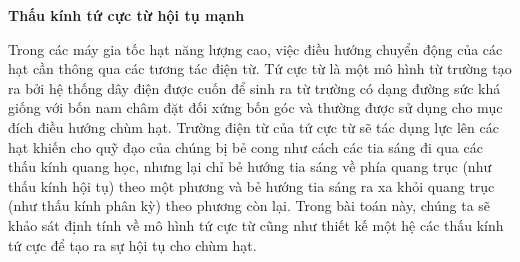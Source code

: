 \textbf{Thấu kính tứ cực từ hội tụ mạnh}

Trong các máy gia tốc hạt năng lượng cao, việc điều hướng chuyển động của các hạt cần thông qua các tương tác điện từ. Tứ cực từ là một mô hình từ trường tạo ra bởi hệ thống dây điện được cuốn để sinh ra từ trường có dạng đường sức khá giống với bốn nam châm đặt đối xứng bốn góc và thường được sử dụng cho mục đích điều hướng chùm hạt. Trường điện từ của tứ cực từ sẽ tác dụng lực lên các hạt khiến cho quỹ đạo của chúng bị bẻ cong như cách các tia sáng đi qua các thấu kính quang học, nhưng lại chỉ bẻ hướng tia sáng về phía quang trục (như thấu kính hội tụ) theo một phương và bẻ hướng tia sáng ra xa khỏi quang trục (như thấu kính phân kỳ) theo phương còn lại. Trong bài toán này, chúng ta sẽ khảo sát định tính về mô hình tứ cực từ cũng như thiết kế một hệ các thấu kính tứ cực để tạo ra sự hội tụ cho chùm hạt.


